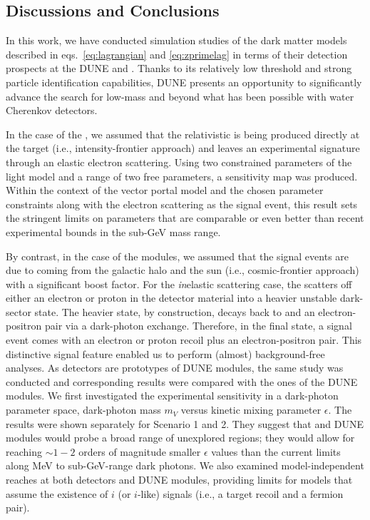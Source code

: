 \subsection{Discussions and Conclusions}

In this work, we have conducted simulation studies of the dark matter models described in eqs.~\eqref{eq:lagrangian} and \eqref{eq:zprimelag} in terms of their detection prospects at the DUNE  and . 
Thanks to its relatively low threshold and strong particle identification capabilities, DUNE presents an opportunity to significantly advance the search for low-mass  and  beyond what has been possible with water Cherenkov detectors.

In the case of the , we assumed that the relativistic  is being produced directly at the target (i.e., intensity-frontier approach) and leaves an experimental signature through an elastic electron scattering. Using two constrained parameters of the light  model and a range of two free parameters, a sensitivity map was produced. Within the context of the vector portal  model and the chosen parameter constraints along with the electron scattering as the signal event, this result sets the stringent limits on  parameters that are comparable or even better than recent experimental bounds in the sub-GeV mass range.

By contrast, in the case of the  modules, we assumed that the signal events are due to  coming from the galactic halo and the sun (i.e., cosmic-frontier approach) with a significant boost factor. 
For the \textit{in}elastic scattering case, the  scatters off either an electron or proton in the detector material into a heavier unstable dark-sector state.
The heavier state, by construction, decays back to  and an electron-positron pair via a dark-photon exchange. 
Therefore, in the final state, a signal event comes with an electron or proton recoil plus an electron-positron pair. 
This distinctive signal feature enabled us to perform (almost) background-free analyses. 
As  detectors are prototypes of DUNE  modules, the same study was conducted and corresponding results were compared with the ones of the DUNE  modules.  
We first investigated the experimental sensitivity in a dark-photon parameter space, dark-photon mass $m_V$ versus kinetic mixing parameter $\epsilon$. 
The results were shown separately for Scenario 1 and 2. 
They suggest that  and DUNE  modules would probe a broad range of unexplored regions; they would allow for reaching $\sim 1-2$ orders of magnitude smaller $\epsilon$ values than the current limits along MeV to sub-GeV-range dark photons. 
We also examined model-independent reaches at both  detectors and DUNE  modules, providing limits for models that assume the existence of $i$ (or $i$-like) signals (i.e., a target recoil and a fermion pair). 

